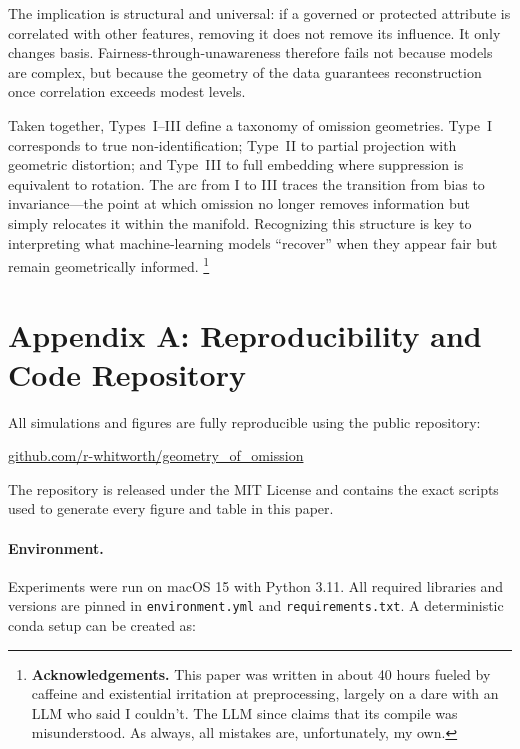 \documentclass[11pt]{article}
\begin{document}
The implication is structural and universal:
if a governed or protected attribute is correlated with other features,
removing it does not remove its influence.
It only changes basis.
Fairness-through-unawareness therefore fails not because models are complex,
but because the geometry of the data guarantees reconstruction once correlation exceeds modest levels.

\medskip
Taken together, Types~I–III define a taxonomy of omission geometries.
Type~I corresponds to true non‐identification; Type~II to partial projection
with geometric distortion; and Type~III to full embedding where suppression is
equivalent to rotation. The arc from I to III traces the transition from bias to invariance—the point at which omission no longer removes information but simply relocates it within the manifold.  Recognizing this structure is key to
interpreting what machine‐learning models ``recover'' when they appear fair but
remain geometrically informed. \footnote{\textbf{Acknowledgements.} This paper was written in about 40 hours fueled by caffeine and existential
irritation at preprocessing, largely on a dare with an LLM who said I couldn’t.
The LLM since claims that its compile was misunderstood.  
As always, all mistakes are, unfortunately, my own.}

\clearpage


\clearpage


\appendix
\section{Appendix A: Reproducibility and Code Repository}
\label{app:reproducibility}

All simulations and figures are fully reproducible using the public repository:

\begin{center}
\href{https://github.com/r-whitworth/geometry_of_omission}
     {github.com/r-whitworth/geometry\_of\_omission}
\end{center}

\noindent The repository is released under the MIT License and contains the
exact scripts used to generate every figure and table in this paper.

\paragraph{Environment.}
Experiments were run on macOS 15 with Python 3.11.
All required libraries and versions are pinned in
\texttt{environment.yml} and \texttt{requirements.txt}.
A deterministic conda setup can be created as:
\end{document}
